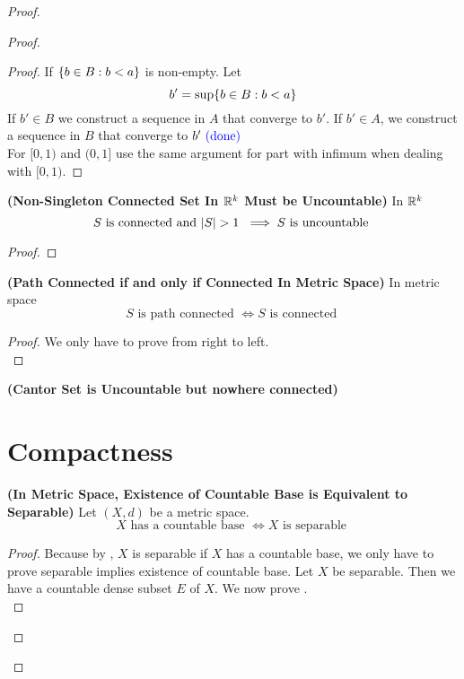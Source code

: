 \documentclass{report}
\begin{document}
\begin{proof}
\begin{proof}
\begin{proof}
If $\{ b\in B:b<a \}$ is non-empty. Let
\begin{equation*}
b'=\sup \{ b\in B:b<a \}
\end{equation*}
If $b'\in B$ we construct a sequence in $A$ that converge to  $b'$. If  $b'\in A$, we construct a sequence in $B$ that converge to  $b'\textcolor{blue}{\text{ (done) }}$\\

For $[0,1)$ and $(0,1]$ use the same argument for  part with infimum when dealing with $[0,1)$.
\end{proof}
\begin{theorem}
\label{3.4.2}
\textbf{(Non-Singleton Connected Set In $\mathbb{R}^k$ Must be Uncountable)} In $\mathbb{R}^k$
\begin{equation*}
  S\text{ is connected and $\abso{S}>1$ }\implies S\text{ is uncountable }
\end{equation*}
\end{theorem}
\begin{proof}

\end{proof}
\begin{theorem}
\label{3.4.3}
\textbf{(Path Connected if and only if Connected In Metric Space)} In metric space 
\begin{equation*}
S\text{ is path connected }\iff  S\text{ is connected }
\end{equation*}
\end{theorem}
\begin{proof}
We only have to prove from right to left.\\


\end{proof}
\begin{theorem}
\label{3.4.4}
\textbf{(Cantor Set is Uncountable but nowhere connected)}
\end{theorem}

\section{Compactness}
\begin{theorem}
\label{3.5.1}
\textbf{(In Metric Space, Existence of Countable Base is Equivalent to Separable)} Let $(X,d)$ be a metric space. 
\begin{equation}
X\text{ has a countable base }\iff  X\text{ is separable }
\end{equation}
\end{theorem}
\begin{proof}
Because by , $X$ is separable if  $X$ has a countable base, we only have to prove separable implies existence of countable base. Let $X$ be separable. Then we have a countable dense subset $E$ of $X$. We now prove
.\\


\end{proof}
\end{proof}
\end{proof}
\end{document}
